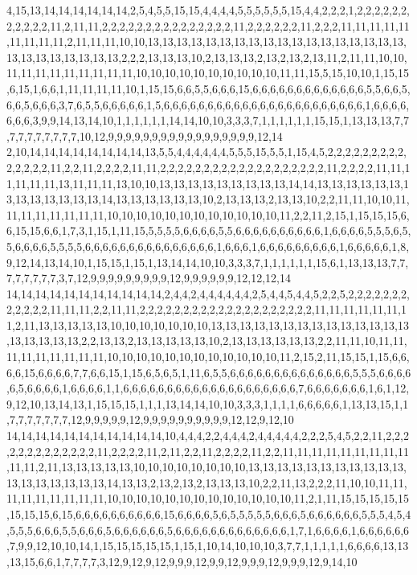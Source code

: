 4,15,13,14,14,14,14,14,14,2,5,4,5,5,15,15,4,4,4,4,5,5,5,5,5,5,15,4,4,2,2,2,1,2,2,2,2,2,2,2,2,2,2,2,11,2,11,11,2,2,2,2,2,2,2,2,2,2,2,2,2,2,2,11,2,2,2,2,2,2,11,2,2,2,11,11,11,11,11,11,11,11,11,2,11,11,11,10,10,13,13,13,13,13,13,13,13,13,13,13,13,13,13,13,13,13,13,13,13,13,13,13,13,13,13,2,2,2,13,13,13,10,2,13,13,13,2,13,2,13,2,13,11,2,11,11,10,10,11,11,11,11,11,11,11,11,11,10,10,10,10,10,10,10,10,10,10,11,11,15,5,15,10,10,1,15,15,6,15,1,6,6,1,11,11,11,11,10,1,15,15,6,6,5,5,6,6,6,15,6,6,6,6,6,6,6,6,6,6,6,6,6,5,5,6,6,5,6,6,5,6,6,6,3,7,6,5,5,6,6,6,6,6,1,5,6,6,6,6,6,6,6,6,6,6,6,6,6,6,6,6,6,6,6,6,6,6,6,1,6,6,6,6,6,6,6,3,9,9,14,13,14,10,1,1,1,1,1,1,14,14,10,10,3,3,3,7,1,1,1,1,1,1,15,15,1,13,13,13,7,7,7,7,7,7,7,7,7,7,10,12,9,9,9,9,9,9,9,9,9,9,9,9,9,9,9,9,9,12,14
2,10,14,14,14,14,14,14,14,14,13,5,5,4,4,4,4,4,4,5,5,5,15,5,5,1,15,4,5,2,2,2,2,2,2,2,2,2,2,2,2,2,2,11,2,2,11,2,2,2,2,11,11,2,2,2,2,2,2,2,2,2,2,2,2,2,2,2,2,2,2,2,11,2,2,2,2,11,11,11,11,11,11,13,11,11,11,13,10,10,13,13,13,13,13,13,13,13,13,14,14,13,13,13,13,13,13,13,13,13,13,13,13,13,14,13,13,13,13,13,13,10,2,13,13,13,2,13,13,10,2,2,11,11,10,10,11,11,11,11,11,11,11,11,10,10,10,10,10,10,10,10,10,10,10,10,11,2,2,11,2,15,1,15,15,15,6,6,15,15,6,6,1,7,3,1,15,1,11,15,5,5,5,5,6,6,6,6,5,5,6,6,6,6,6,6,6,6,6,6,1,6,6,6,6,5,5,5,6,5,5,6,6,6,6,5,5,5,5,6,6,6,6,6,6,6,6,6,6,6,6,6,6,6,1,6,6,6,1,6,6,6,6,6,6,6,6,6,1,6,6,6,6,6,1,8,9,12,14,13,14,10,1,15,15,1,15,1,13,14,14,10,10,3,3,3,7,1,1,1,1,1,1,15,6,1,13,13,13,7,7,7,7,7,7,7,7,3,7,12,9,9,9,9,9,9,9,9,9,12,9,9,9,9,9,9,12,12,12,14
14,14,14,14,14,14,14,14,14,14,14,2,4,4,2,4,4,4,4,4,4,2,5,4,4,5,4,4,5,2,2,5,2,2,2,2,2,2,2,2,2,2,2,2,11,11,11,2,2,11,11,2,2,2,2,2,2,2,2,2,2,2,2,2,2,2,2,2,2,2,2,11,11,11,11,11,11,11,2,11,13,13,13,13,13,10,10,10,10,10,10,10,13,13,13,13,13,13,13,13,13,13,13,13,13,13,13,13,13,13,13,2,2,13,13,2,13,13,13,13,13,10,2,13,13,13,13,13,13,2,2,11,11,10,11,11,11,11,11,11,11,11,11,10,10,10,10,10,10,10,10,10,10,10,10,11,2,15,2,11,15,15,1,15,6,6,6,6,15,6,6,6,6,7,7,6,6,15,1,15,6,5,6,5,1,11,6,5,5,6,6,6,6,6,6,6,6,6,6,6,6,6,6,5,5,5,6,6,6,6,6,5,6,6,6,6,1,6,6,6,6,1,1,6,6,6,6,6,6,6,6,6,6,6,6,6,6,6,6,6,6,6,6,7,6,6,6,6,6,6,6,1,6,1,12,9,12,10,13,14,13,1,15,15,15,1,1,1,13,14,14,10,10,3,3,3,1,1,1,1,6,6,6,6,6,1,13,13,15,1,1,7,7,7,7,7,7,7,12,9,9,9,9,9,12,9,9,9,9,9,9,9,9,9,9,12,12,9,12,10
14,14,14,14,14,14,14,14,14,14,14,10,4,4,4,2,2,4,4,4,2,4,4,4,4,4,2,2,2,5,4,5,2,2,11,2,2,2,2,2,2,2,2,2,2,2,2,2,11,2,2,2,2,11,2,11,2,2,11,2,2,2,2,11,2,2,11,11,11,11,11,11,11,11,11,11,11,2,11,13,13,13,13,13,10,10,10,10,10,10,10,10,13,13,13,13,13,13,13,13,13,13,13,13,13,13,13,13,13,13,14,13,13,2,13,2,13,2,13,13,13,10,2,2,11,13,2,2,2,11,10,10,11,11,11,11,11,11,11,11,11,10,10,10,10,10,10,10,10,10,10,10,10,10,11,2,1,11,15,15,15,15,15,15,15,15,6,15,6,6,6,6,6,6,6,6,6,6,15,6,6,6,6,5,6,5,5,5,5,5,6,6,6,5,6,6,6,6,6,6,5,5,5,4,5,4,5,5,5,6,6,6,5,5,6,6,6,5,6,6,6,6,6,6,5,6,6,6,6,6,6,6,6,6,6,6,6,6,1,7,1,6,6,6,6,1,6,6,6,6,6,6,7,9,9,12,10,10,14,1,15,15,15,15,15,1,15,1,10,14,10,10,10,3,7,7,1,1,1,1,1,6,6,6,6,13,13,13,15,6,6,1,7,7,7,7,3,12,9,12,9,12,9,9,9,12,9,9,12,9,9,9,12,9,9,9,12,9,14,10
